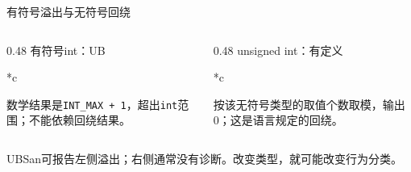 \begin{frame}{有符号溢出与无符号回绕}
    \begin{columns}[T]
        \begin{column}{0.48\textwidth}
            \small \alert{有符号int：UB}
            \begin{Code}*{c}
                
            \end{Code}
            \small 数学结果是\texttt{INT\_MAX + 1}，超出\texttt{int}范围；不能依赖回绕结果。
        \end{column}
        \begin{column}{0.48\textwidth}
            \small \alert{unsigned int：有定义}
            \begin{Code}*{c}
                
            \end{Code}
            \small 按该无符号类型的取值个数取模，输出\alert{0}；这是语言规定的回绕。
        \end{column}
    \end{columns}
    \medskip
    \small UBSan可报告左侧溢出；右侧通常没有诊断。\alert{改变类型，就可能改变行为分类。}
\end{frame}

